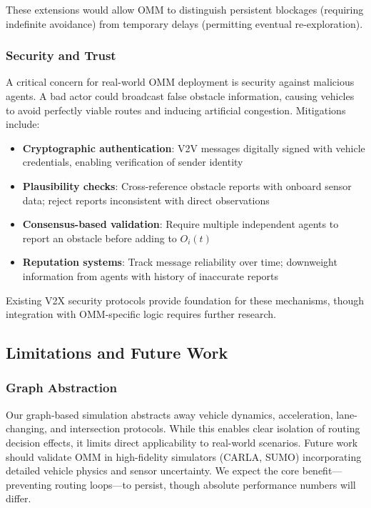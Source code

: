 \documentclass[conference]{IEEEtran}
\begin{document}
These extensions would allow OMM to distinguish persistent blockages (requiring indefinite avoidance) from temporary delays (permitting eventual re-exploration).

\subsubsection{Security and Trust}

A critical concern for real-world OMM deployment is security against malicious agents. A bad actor could broadcast false obstacle information, causing vehicles to avoid perfectly viable routes and inducing artificial congestion. Mitigations include:
\begin{itemize}
    \item \textbf{Cryptographic authentication}: V2V messages digitally signed with vehicle credentials, enabling verification of sender identity
    \item \textbf{Plausibility checks}: Cross-reference obstacle reports with onboard sensor data; reject reports inconsistent with direct observations
    \item \textbf{Consensus-based validation}: Require multiple independent agents to report an obstacle before adding to $O_i(t)$
    \item \textbf{Reputation systems}: Track message reliability over time; downweight information from agents with history of inaccurate reports
\end{itemize}

Existing V2X security protocols \cite{muslam2024enhancing} provide foundation for these mechanisms, though integration with OMM-specific logic requires further research.

\subsection{Limitations and Future Work}

\subsubsection{Graph Abstraction}

Our graph-based simulation abstracts away vehicle dynamics, acceleration, lane-changing, and intersection protocols. While this enables clear isolation of routing decision effects, it limits direct applicability to real-world scenarios. Future work should validate OMM in high-fidelity simulators (CARLA, SUMO) incorporating detailed vehicle physics and sensor uncertainty. We expect the core benefit—preventing routing loops—to persist, though absolute performance numbers will differ.
\end{document}
